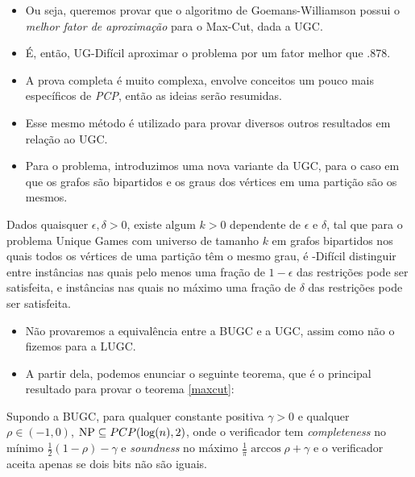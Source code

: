 \documentclass[12pt,a4paper]{article}
\begin{document}
\begin{itemize}
    \item Ou seja, queremos provar que o algoritmo de Goemans-Williamson possui o \emph{melhor fator de aproximação} para o Max-Cut, dada a UGC.
    \item É, então, UG-Difícil aproximar o problema por um fator melhor que .878.
    \item A prova completa é muito complexa, envolve conceitos um pouco mais específicos de \emph{PCP}, então as ideias serão resumidas.
    \item Esse mesmo método é utilizado para provar diversos outros resultados em relação ao UGC.
    \item Para o problema, introduzimos uma nova variante da UGC, para o caso em que os grafos são bipartidos e os graus dos vértices em uma partição são os mesmos.
\end{itemize}

\begin{conjectura}
    Dados quaisquer $\epsilon,\delta>0$, existe algum $k>0$ dependente de $\epsilon$ e $\delta$, tal que para o problema Unique Games com universo de tamanho $k$ em grafos bipartidos nos quais todos os vértices de uma partição têm o mesmo grau, é \np-Difícil distinguir entre instâncias nas quais pelo menos uma fração de $1-\epsilon$ das restrições pode ser satisfeita, e instâncias nas quais no máximo uma fração de $\delta$ das restrições pode ser satisfeita.
\end{conjectura}

\begin{itemize}
    \item Não provaremos a equivalência entre a BUGC e a UGC, assim como não o fizemos para a LUGC.
    \item A partir dela, podemos enunciar o seguinte teorema, que é o principal resultado para provar o teorema \ref{maxcut}:
\end{itemize}

\begin{teorema}\label{bugc-pcp}
    Supondo a BUGC, para qualquer constante positiva $\gamma>0$ e qualquer $\rho \in (-1,0)$, $\mathrm{NP} \subseteq PCP(\log (n),2)$, onde o verificador tem \textit{completeness} no mínimo $\frac{1}{2} (1-\rho)-\gamma$ e \textit{soundness} no máximo $\frac{1}{\pi} \arccos{\rho} + \gamma$ e o verificador aceita apenas se dois bits não são iguais.
\end{teorema}
\end{document}
